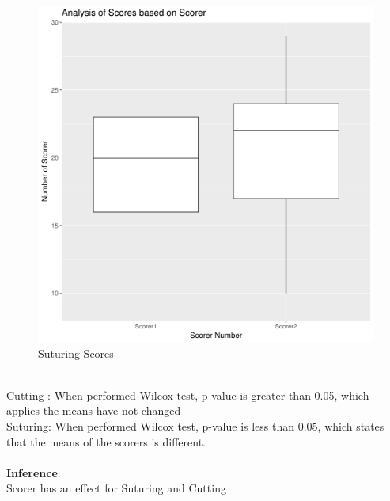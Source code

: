 \documentclass[12pt,epsf]{report}
\begin{document}
\begin{figure}[!htb]
\begin{minipage}[c]{0.5\linewidth}
	\includegraphics[width=\linewidth]{Suturing_ScorerVsScore.pdf}
	\caption{Suturing Scores}
	\end{minipage}
\end{figure}
\\
Cutting : When performed Wilcox test, p-value is greater than 0.05, which applies the means have not changed\\
Suturing: When performed Wilcox test, p-value is less than 0.05, which states that the means of the scorers is different. \\
\\
\textbf{Inference}:\\
Scorer has an effect for Suturing and Cutting\\
\FloatBarrier
\end{document}
